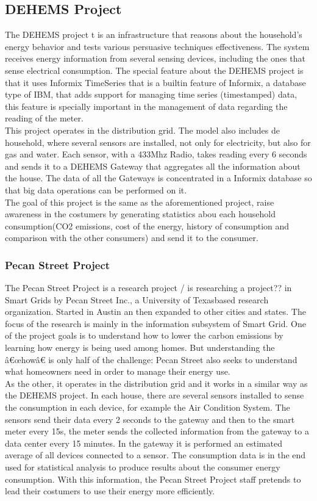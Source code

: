 \subsection{DEHEMS Project}
The DEHEMS project \cite{website:dehems}t is an infrastructure that reasons about the household's energy behavior and tests various persuasive techniques effectiveness. The system receives energy information from several sensing devices, including the ones that sense electrical consumption. The special feature about the DEHEMS project is that it uses Informix TimeSeries \cite{website:informix} that is a built­in feature of Informix, a database type of IBM, that adds support for managing time series (time­stamped) data, this feature is specially important in the management of data regarding the reading of the meter.\\
This project operates in the distribution grid. The model also includes de household, where several sensors are installed, not only for electricity, but also for gas and water. Each sensor, with a 433Mhz Radio, takes reading every 6 seconds and sends it to a DEHEMS Gateway that aggregates all the information about the house. The data of all the Gateways is concentrated in a Informix database so that big data operations can be performed on it.\\The goal of this project is the same as the aforementioned project, raise awareness in the costumers by generating statistics abou each household consumption(CO2 emissions, cost of the energy, history of consumption and comparison with the other consumers) and send it to the consumer.
\subsubsection{Pecan Street Project}
The Pecan Street Project\cite{website:pecan} is a research project / is researching a project?? in Smart Grids by Pecan Street Inc., a University of Texas­based research organization. Started in Austin an then expanded to other cities and states. The focus of the research is mainly in the information subsystem of Smart Grid. One of the project goals is to understand how to lower the carbon emissions by learning how energy is being used among homes. But understanding the â€œhowâ€ is only half of the challenge: Pecan Street also seeks to understand what homeowners need in order to manage their energy use.\\
As the other, it operates in the distribution grid and it works in a similar way as the DEHEMS project. In each house, there are several sensors installed to sense the consumption in each device, for example the Air Condition System. The sensors send their data every 2 seconds to the gateway and then to the smart meter every 15s, the meter sends the collected information from the gateway to a data center every 15 minutes. In the gateway it is performed an estimated average of all devices connected to a sensor. The consumption data is in the end used for statistical analysis to produce results about the consumer energy consumption. With this information, the Pecan Street Project staff pretends to lead their costumers to use their energy more efficiently.
